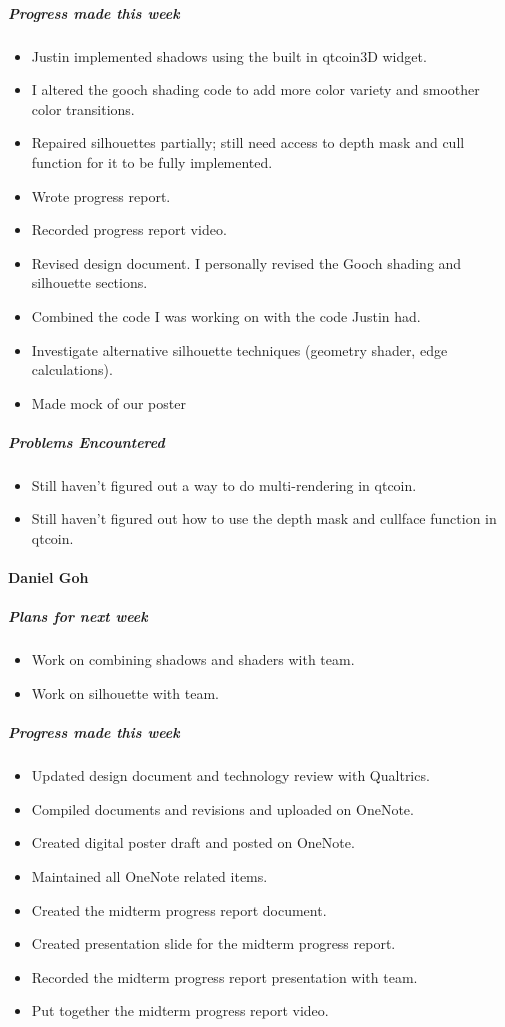 {\subparagraph{Progress made this week}
\begin{itemize}
  \item Justin implemented shadows using the built in qtcoin3D widget.
  \item I altered the gooch shading code to add more color variety and smoother color transitions.
  \item Repaired silhouettes partially; still need access to depth mask and cull function for it to be fully implemented.
  \item Wrote progress report.
  \item Recorded progress report video.
  \item Revised design document. I personally revised the Gooch shading and silhouette sections.
  \item Combined the code I was working on with the code Justin had.
  \item Investigate alternative silhouette techniques (geometry shader, edge calculations).
  \item Made mock of our poster
\end{itemize}

\subparagraph{Problems Encountered}
\begin{itemize}
  \item Still haven't figured out a way to do multi-rendering in qtcoin.
  \item Still haven't figured out how to use the depth mask and cullface function in qtcoin.
\end{itemize}

\vspace{3mm}
\paragraph{Daniel Goh}
\subparagraph{Plans for next week}
\begin{itemize}
  \item Work on combining shadows and shaders with team.
  \item Work on silhouette with team.
\end{itemize}

\subparagraph{Progress made this week}
\begin{itemize}
  \item Updated design document and technology review with Qualtrics.
  \item Compiled documents and revisions and uploaded on OneNote.
  \item Created digital poster draft and posted on OneNote.
  \item Maintained all OneNote related items.
  \item Created the midterm progress report document.
  \item Created presentation slide for the midterm progress report.
  \item Recorded the midterm progress report presentation with team.
  \item Put together the midterm progress report video.
\end{itemize}

}
